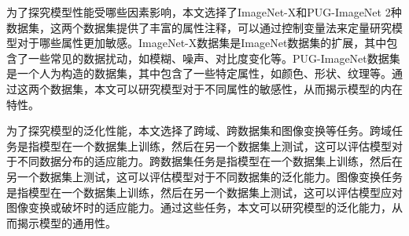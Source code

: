 为了探究模型性能受哪些因素影响，本文选择了ImageNet-X和PUG-ImageNet 2种数据集，这两个数据集提供了丰富的属性注释，可以通过控制变量法来定量研究模型对于哪些属性更加敏感。ImageNet-X数据集是ImageNet数据集的扩展，其中包含了一些常见的数据扰动，如模糊、噪声、对比度变化等。PUG-ImageNet数据集是一个人为构造的数据集，其中包含了一些特定属性，如颜色、形状、纹理等。通过这两个数据集，本文可以研究模型对于不同属性的敏感性，从而揭示模型的内在特性。

为了探究模型的泛化性能，本文选择了跨域、跨数据集和图像变换等任务。跨域任务是指模型在一个数据集上训练，然后在另一个数据集上测试，这可以评估模型对于不同数据分布的适应能力。跨数据集任务是指模型在一个数据集上训练，然后在另一个数据集上测试，这可以评估模型对于不同数据集的泛化能力。图像变换任务是指模型在一个数据集上训练，然后在另一个数据集上测试，这可以评估模型应对图像变换或破坏时的适应能力。通过这些任务，本文可以研究模型的泛化能力，从而揭示模型的通用性。
